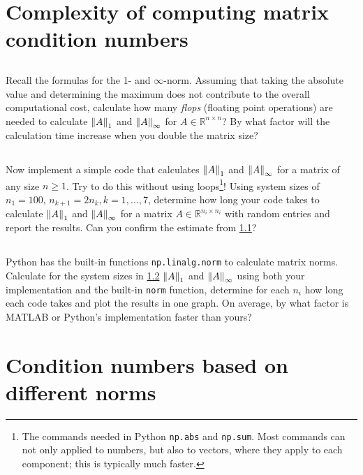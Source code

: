 \documentclass[11pt,letterpaper]{article}
\begin{document}
 
\section{Complexity of computing matrix condition numbers}
\subsection{}\label{eq:comp_norm_a}
Recall the formulas for the 1- and $\infty$-norm. Assuming that taking the absolute value and determining the maximum does not contribute to the overall computational cost, calculate how many \textit{flops} (floating point operations) are needed to calculate $\left\Vert A \right\Vert_1$ and $\left\Vert A \right\Vert_\infty$ for $A\in\mathbb{R}^{n\times n}$? By what factor will the calculation time increase when you double the matrix size?

\subsection{}\label{eq:comp_norm_b}
Now implement a simple code that calculates $\left\Vert A \right\Vert_1$ and $\left\Vert A \right\Vert_\infty$ for a matrix of any size $n\geq 1$. Try to do this without using loops\footnote{The commands needed in Python \texttt{np.abs} and \texttt{np.sum}. Most commands can not only applied to numbers, but also to vectors, where they apply to each component; this is typically much faster.}! Using system sizes of $n_1=100$, $n_{k+1}=2n_k,k=1,\ldots,7$, determine how long your code takes to calculate $\left\Vert A \right\Vert_1$ and $\left\Vert A \right\Vert_\infty$ for a matrix $A\in\mathbb{R}^{n_i\times n_i}$ with random entries and report the results. Can you confirm the estimate from \ref{eq:comp_norm_a}?

\subsection{}
Python has the built-in functions \texttt{np.linalg.norm} to calculate matrix norms. Calculate for the system sizes in \ref{eq:comp_norm_b} $\left\Vert A \right\Vert_1$ and $\left\Vert A \right\Vert_\infty$ using both your implementation and the built-in \texttt{norm} function, determine for each $n_i$ how long each code takes and plot the results in one graph. On average, by what factor is MATLAB or Python's implementation faster than yours?



\section{Condition numbers based on different norms}
\end{document}
